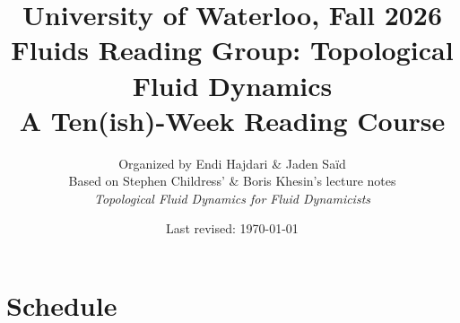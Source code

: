 \documentclass{article}
\title{
    {\large University of Waterloo, Fall 2026}\\[0.4em]
    {\huge\bfseries Fluids Reading Group: Topological Fluid Dynamics}\\[0.4em]
    {\Large A Ten(ish)-Week Reading Course}
}
\author{
    {\large Organized by Endi Hajdari \& Jaden Saïd}\\[1.2em]
    {\normalsize Based on Stephen Childress' \& Boris Khesin's lecture notes}\\[0.2em]
    {\normalsize\itshape Topological Fluid Dynamics for Fluid Dynamicists}
}
\date{
    \vspace{0.5cm}
    {\small Last revised: \today}
}
\begin{document}
\maketitle

\section{Schedule}
\end{document}
